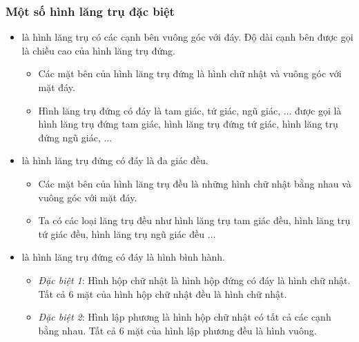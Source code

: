 \subsubsection{Một số hình lăng trụ đặc biệt}
\begin{itemize}
	\item [\iconMT]  là hình lăng trụ có các cạnh bên vuông góc với đáy. Độ dài cạnh bên được gọi là chiều cao của hình lăng trụ đứng.
	\begin{tcolorbox}[colframe=cyan,colback=red!3!white,boxrule=0.5mm]
		\begin{itemize}
			\item Các mặt bên của hình lăng trụ đứng là hình chữ nhật và vuông góc với mặt đáy.
			\item Hình lăng trụ đứng có đáy là tam giác, tứ giác, ngũ giác, $\ldots$ được gọi là hình lăng trụ đứng tam giác, hình lăng trụ đứng tứ giác, hình lăng trụ đứng ngũ giác, $\ldots$
		\end{itemize}
	\end{tcolorbox}
	
	\item [\iconMT]  là hình lăng trụ đứng có đáy là đa giác đều.
	\begin{tcolorbox}[colframe=cyan,colback=red!3!white,boxrule=0.5mm]
		\begin{itemize}
			\item Các mặt bên của hình lăng trụ đều là những hình chữ nhật bằng nhau và vuông góc với mặt đáy.
			\item Ta có các loại lăng trụ đều như hình lăng trụ tam giác đều, hình lăng trụ tứ giác đều, hình lăng trụ ngũ giác đều $\ldots$
		\end{itemize}
	\end{tcolorbox}
	\item [\iconMT]  là hình lăng trụ đứng có đáy là hình bình hành.
	\begin{tcolorbox}[colframe=cyan,colback=red!3!white,boxrule=0.5mm]
			\begin{itemize}
			\item \textit{Đặc biệt 1}: Hình hộp chữ nhật là hình hộp đứng có đáy là hình chữ nhật. Tất cả 6 mặt của hình hộp chữ nhật đều là hình chữ nhật.
			\item  \textit{Đặc biệt 2}: Hình lập phương là hình hộp chữ nhật có tất cả các cạnh bằng nhau. Tất cả 6 mặt của hình lập phương đều là hình vuông.
		\end{itemize}
	\end{tcolorbox}
\end{itemize}

